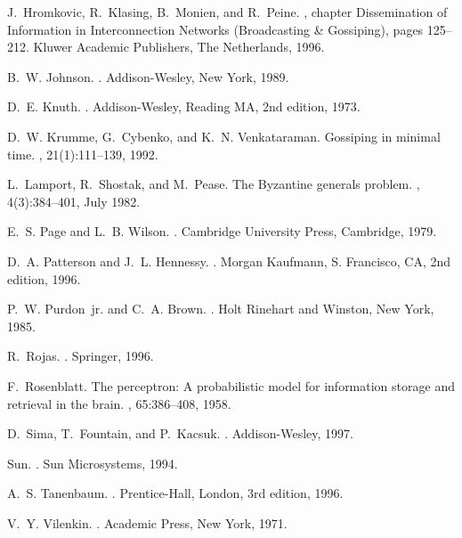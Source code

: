 \documentclass{elsart}
\begin{document}
\begin{thebibliography}{10}
J.~Hromkovic, R.~Klasing, B.~Monien, and R.~Peine.
, chapter Dissemination of
  Information in Interconnection Networks (Broadcasting \& Gossiping), pages
  125--212.
\newblock Kluwer Academic Publishers, The Netherlands, 1996.

B.~W. Johnson.
.
\newblock Addison-Wesley, New York, 1989.

D.~E. Knuth.
.
\newblock Addison-Wesley, Reading MA, 2nd edition, 1973.

D.~W. Krumme, G.~Cybenko, and K.~N. Venkataraman.
\newblock Gossiping in minimal time.
, 21(1):111--139, 1992.

L.~Lamport, R.~Shostak, and M.~Pease.
\newblock The {B}yzantine generals problem.
, 4(3):384--401,
  July 1982.

E.~S. Page and L.~B. Wilson.
.
\newblock Cambridge University Press, Cambridge, 1979.

D.~A. Patterson and J.~L. Hennessy.
.
\newblock Morgan Kaufmann, S. Francisco, CA, 2nd edition, 1996.

P.~W. Purdon~jr. and C.~A. Brown.
.
\newblock Holt Rinehart and Winston, New York, 1985.

R.~Rojas.
.
\newblock Springer, 1996.

F.~Rosenblatt.
\newblock The perceptron: A probabilistic model for information storage and
  retrieval in the brain.
, 65:386--408, 1958.

D.~Sima, T.~Fountain, and P.~Kacsuk.
.
\newblock Addison-Wesley, 1997.

Sun.
.
\newblock Sun Microsystems, 1994.

A.~S. Tanenbaum.
.
\newblock Prentice-Hall, London, 3rd edition, 1996.

V.~Y. Vilenkin.
.
\newblock Academic Press, New York, 1971.

\end{thebibliography}
\end{document}
